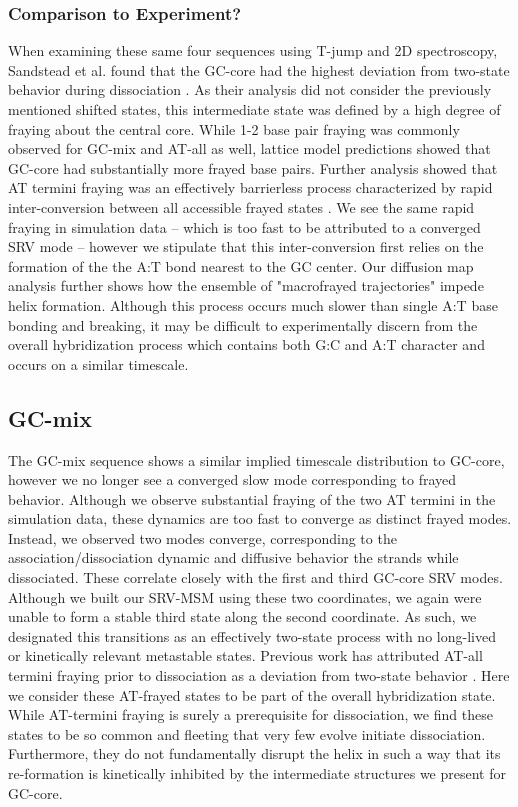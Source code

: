 \documentclass[journal=jpcbfk,manuscript=article]{achemso}
\begin{document}
\subsubsection{\label{sec:Results}Comparison to Experiment?}

When examining these same four sequences using T-jump and 2D spectroscopy, Sandstead et al. found that the GC-core had the highest deviation from two-state behavior during dissociation \citep{Sanstead2016}. As their analysis did not consider the previously mentioned shifted states, this intermediate state was defined by a high degree of fraying about the central core. While 1-2 base pair fraying was commonly observed for GC-mix and AT-all as well, lattice model predictions showed that GC-core had substantially more frayed base pairs. Further analysis showed that AT termini fraying was an effectively barrierless process characterized by rapid inter-conversion between all accessible frayed states \citep{Sanstead2018DirectDehybridization}. We see the same rapid fraying in simulation data -- which is too fast to be attributed to a converged SRV mode -- however we stipulate that this inter-conversion first relies on the formation of the the A:T bond nearest to the GC center. Our diffusion map analysis further shows how the ensemble of "macrofrayed trajectories" impede helix formation. Although this process occurs much slower than single A:T base bonding and breaking, it may be difficult to experimentally discern from the overall hybridization process which contains both G:C and A:T character and occurs on a similar timescale.


\subsection{\label{sec:Results}GC-mix}

The GC-mix sequence shows a similar implied timescale distribution to GC-core, however we no longer see a converged slow mode corresponding to frayed behavior. Although we observe substantial fraying of the two AT termini in the simulation data, these dynamics are too fast to converge as distinct frayed modes. Instead, we observed two modes converge, corresponding to the association/dissociation dynamic and diffusive behavior the strands while dissociated. These correlate closely with the first and third GC-core SRV modes. Although we built our SRV-MSM using these two coordinates, we again were unable to form a stable third state along the second coordinate. As such, we designated this transitions as an effectively two-state process with no long-lived or kinetically relevant metastable states. Previous work has attributed AT-all termini fraying prior to dissociation as a deviation from two-state behavior \citep{Sanstead2016}. Here we consider these AT-frayed states to be part of the overall hybridization state. While AT-termini fraying is surely a prerequisite for dissociation, we find these states to be so common and fleeting that very few evolve initiate dissociation. Furthermore, they do not fundamentally disrupt the helix in such a way that its re-formation is kinetically inhibited by the intermediate structures we present for GC-core.
\end{document}
